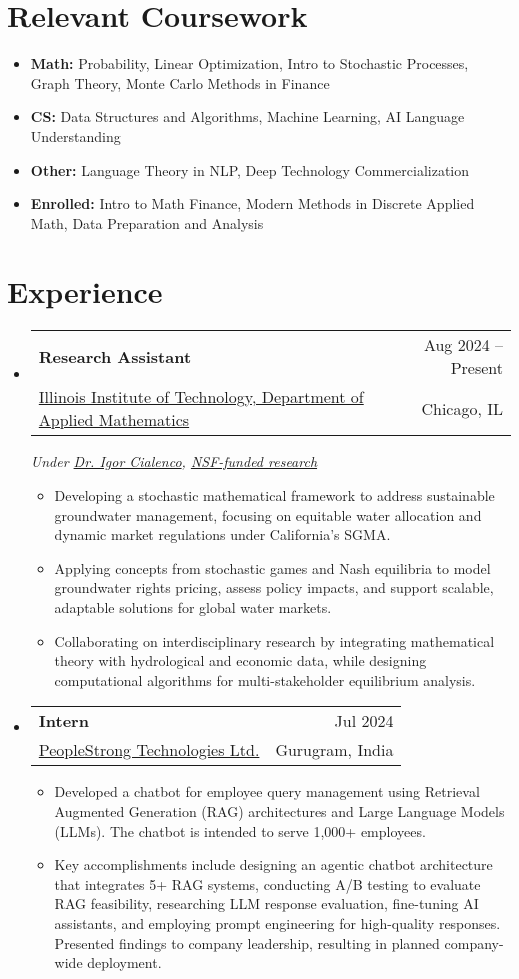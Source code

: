 \documentclass[letterpaper,10pt]{article}
\makeatletter
\newcommand\indentsize{10pt}
\newcommand{\resumeItem}[1]{
  \item\small{
    {#1 \vspace{-2pt}}
  }
}
\newcommand{\resumeSubheading}[4]{
    \item\vspace{-2pt}
    \begin{tabular*}{0.97\textwidth}[t]{l@{\extracolsep{\fill}}r}
      \textbf{#1} & #2 \\
      #3 & #4 \\
    \end{tabular*}
}
\newcommand{\resumeSubHeadingListStart}{\begin{itemize}[leftmargin=0.15in, label=]}
\newcommand{\resumeSubHeadingListEnd}{\end{itemize}}
\newcommand{\resumeItemListStart}{\begin{itemize}[leftmargin=\indentsize, label=-]\vspace{-7pt}}
\newcommand{\resumeItemListEnd}{\end{itemize}\vspace{-5pt}}
\makeatother
\begin{document}
\vspace{-12pt}
\section{Relevant Coursework}
\resumeSubHeadingListStart
    \item \textbf{Math:} Probability, Linear Optimization, Intro to Stochastic Processes, Graph Theory, Monte Carlo Methods in Finance \vspace{-5pt}
    \item \textbf{CS:} Data Structures and Algorithms, Machine Learning, AI Language Understanding \vspace{-5pt}
    \item \textbf{Other:} Language Theory in NLP, Deep Technology Commercialization \vspace{-5pt}
    \item \textbf{Enrolled:} Intro to Math Finance, Modern Methods in Discrete Applied Math, Data Preparation and Analysis
\resumeSubHeadingListEnd


\section{Experience}
\resumeSubHeadingListStart
    \resumeSubheading{Research Assistant}{Aug 2024 -- Present}{\href{https://www.iit.edu/applied-math}{Illinois Institute of Technology, Department of Applied Mathematics}}{Chicago, IL}
    \textit{Under \href{https://cialenco.com}{Dr. Igor Cialenco}, \href{https://www.nsf.gov/awardsearch/showAward?AWD_ID=2407549&HistoricalAwards=false}{NSF-funded research}}
        \resumeItemListStart
            \resumeItem{Developing a stochastic mathematical framework to address sustainable groundwater management, focusing on equitable water allocation and dynamic market regulations under California's SGMA.}
            \resumeItem{Applying concepts from stochastic games and Nash equilibria to model groundwater rights pricing, assess policy impacts, and support scalable, adaptable solutions for global water markets.}
            \resumeItem{Collaborating on interdisciplinary research by integrating mathematical theory with hydrological and economic data, while designing computational algorithms for multi-stakeholder equilibrium analysis.}
        \resumeItemListEnd
    \resumeSubheading{Intern}{Jul 2024}{\href{https://www.peoplestrong.com/about-us/}{PeopleStrong Technologies Ltd.}}{Gurugram, India}
        \resumeItemListStart
            \resumeItem{Developed a chatbot for employee query management using Retrieval Augmented Generation (RAG) architectures and Large Language Models (LLMs). The chatbot is intended to serve 1,000+ employees.}
            \resumeItem{Key accomplishments include designing an agentic chatbot architecture that integrates 5+ RAG systems, conducting A/B testing to evaluate RAG feasibility, researching LLM response evaluation, fine-tuning AI assistants, and employing prompt engineering for high-quality responses. Presented findings to company leadership, resulting in planned company-wide deployment.}
        \resumeItemListEnd
\resumeSubHeadingListEnd
\end{document}
